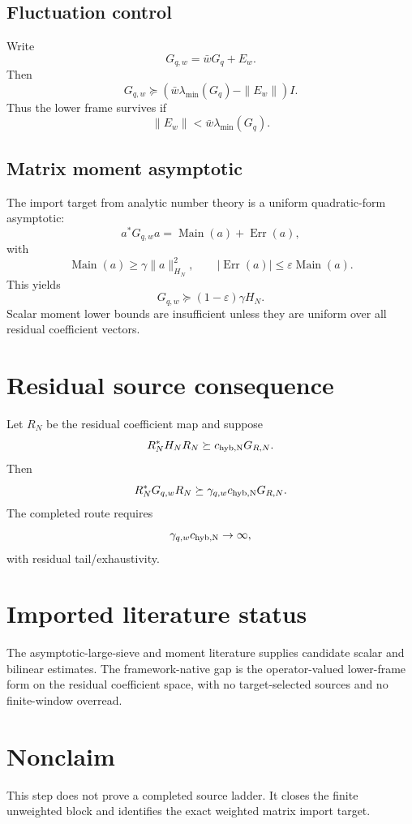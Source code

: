 \documentclass[11pt]{article}
\begin{document}
\subsection{Fluctuation control}
Write
\[
G_{q,w}=\bar wG_q+E_w.
\]
Then
\[
G_{q,w}\succeq (\bar w\lambda_{\min}(G_q)-\|E_w\|)I.
\]
Thus the lower frame survives if
\[
\|E_w\|<\bar w\lambda_{\min}(G_q).
\]

\subsection{Matrix moment asymptotic}
The import target from analytic number theory is a uniform quadratic-form asymptotic:
\[
a^*G_{q,w}a=\operatorname{Main}(a)+\operatorname{Err}(a),
\]
with
\[
\operatorname{Main}(a)\ge\gamma\|a\|_{H_N}^2,
\qquad
|\operatorname{Err}(a)|\le\varepsilon\operatorname{Main}(a).
\]
This yields
\[
G_{q,w}\succeq (1-\varepsilon)\gamma H_N.
\]
Scalar moment lower bounds are insufficient unless they are uniform over all residual coefficient vectors.

\section{Residual source consequence}
Let $R_N$ be the residual coefficient map and suppose
\[
R_N^*H_NR_N\succeq c_{\rm hyb,N}G_{R,N}.
\]
Then
\[
R_N^*G_{q,w}R_N\succeq\gamma_{q,w}c_{\rm hyb,N}G_{R,N}.
\]
The completed route requires
\[
\gamma_{q,w}c_{\rm hyb,N}\to\infty,
\]
with residual tail/exhaustivity.

\section{Imported literature status}
The asymptotic-large-sieve and moment literature supplies candidate scalar and bilinear estimates.  The framework-native gap is the operator-valued lower-frame form on the residual coefficient space, with no target-selected sources and no finite-window overread.

\section{Nonclaim}
This step does not prove a completed source ladder.  It closes the finite unweighted block and identifies the exact weighted matrix import target.
\end{document}
